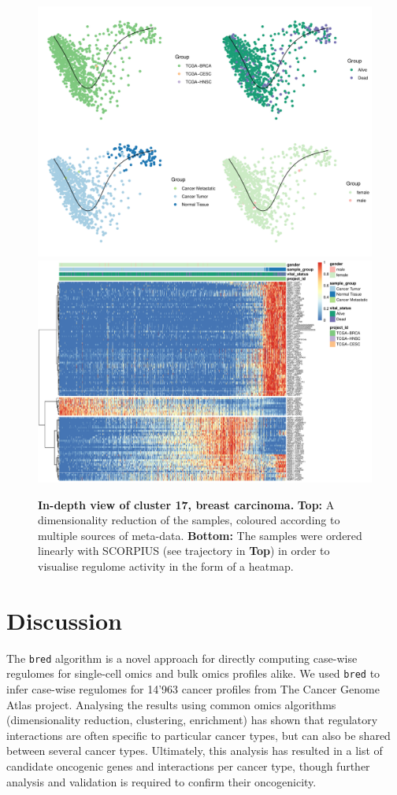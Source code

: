 \begin{figure}[htb!]
	\centering
	\includegraphics[width=.7\linewidth]{fig/tcga/zoom_cluster17_brca_plot.pdf}
	\includegraphics[width=.7\linewidth]{fig/tcga/zoom_cluster17_brca_heatmap.pdf}
	\caption{
		\textbf{In-depth view of cluster 17, breast carcinoma.} 
		\textbf{Top:} A dimensionality reduction of the samples, coloured according to multiple sources of meta-data. 
		\textbf{Bottom:} The samples were ordered linearly with SCORPIUS (see trajectory in \textbf{Top}) in order to visualise regulome activity in the form of a heatmap.
	}
	\label{fig:zoom17}
\end{figure}


\section{Discussion}

The \texttt{bred} algorithm is a novel approach for directly computing case-wise regulomes for single-cell omics and bulk omics profiles alike. We used \texttt{bred} to infer case-wise regulomes for 14'963 cancer profiles from The Cancer Genome Atlas project. Analysing the results using common omics algorithms (dimensionality reduction, clustering, enrichment) has shown that regulatory interactions are often specific to particular cancer types, but can also be shared between several cancer types. Ultimately, this analysis has resulted in a list of candidate oncogenic genes and interactions per cancer type, though further analysis and validation is required to confirm their oncogenicity.

